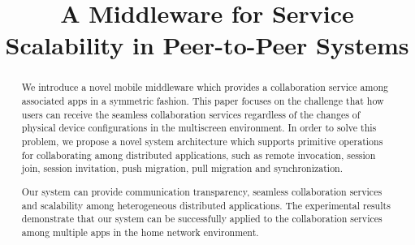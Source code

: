\documentclass[conference]{IEEEtran}
\begin{document}
    \title{A Middleware for Service Scalability in Peer-to-Peer Systems }

    \author{
    }

    \maketitle

\begin{abstract}
We introduce a novel mobile middleware which provides a collaboration service among associated apps in a symmetric fashion.
This paper focuses on the challenge that how users can  receive the seamless collaboration services regardless of the changes of physical device configurations in the multiscreen environment.
In order to solve this problem, we propose a novel system architecture which supports primitive operations for collaborating among distributed applications, such as remote invocation, session join, session invitation,  push migration, pull migration and synchronization.

Our system can provide communication transparency, seamless collaboration services and scalability among heterogeneous distributed applications.
The experimental results demonstrate that our system can be successfully applied to the collaboration services among multiple apps in the home network environment.
\end{abstract}
\end{document}
